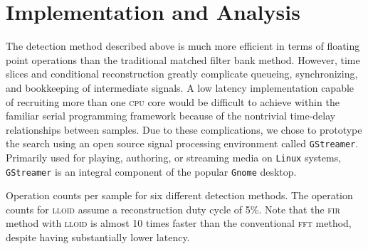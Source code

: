 \section{Implementation and Analysis}
\label{SECIII}\label{sec:analysis}

 The detection method described above is much more efficient in terms of floating point operations than the traditional matched filter bank method.  However, time slices and conditional reconstruction greatly complicate queueing, synchronizing, and bookkeeping of intermediate signals.  A low latency implementation capable of recruiting more than one \textsc{cpu} core would be difficult to achieve within the familiar serial programming framework because of the nontrivial time-delay relationships between samples.  Due to these complications, we chose to prototype the search using an open source signal processing environment called \texttt{GStreamer}.    Primarily used for playing, authoring, or streaming media on \texttt{Linux} systems, \texttt{GStreamer} is an integral component of the popular \texttt{Gnome} desktop.


\begin{table}[!h]
\caption{Operation counts per sample for six different detection methods.  The operation counts for \textsc{lloid} assume a reconstruction duty cycle of 5\%.  Note that the \textsc{fir} method with \textsc{lloid} is almost 10 times faster than the conventional \textsc{fft} method, despite having substantially lower latency.}
\begin{center}

\end{center}
\end{table}

